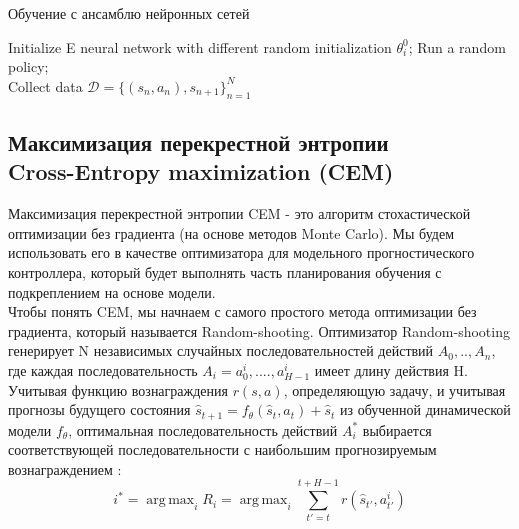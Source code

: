 \documentclass[a4paper,12pt]{article}
\DeclareMathOperator*{\argmax}{arg\,max}
\DeclareMathOperator*{\argmax}{arg\,max}
\begin{document}
\begin{algorithm}[H]
\SetAlgoLined
\DontPrintSemicolon
\caption{Обучение с ансамблю нейронных сетей}
Initialize E neural network with different random initialization $\theta_i^0$;
Run a random policy;\\
Collect data $\mathcal{D}=\{(s_n,a_n), s_{n+1}\}_{n=1}^N$\\
\end{algorithm}

\newpage
\subsection{Максимизация перекрестной энтропии\\
Cross-Entropy maximization (CEM)}
Максимизация перекрестной энтропии CEM - это алгоритм стохастической оптимизации без градиента (на основе методов Monte Carlo). Мы будем использовать его в качестве оптимизатора для модельного прогностического контроллера, который будет выполнять часть планирования обучения с подкреплением на основе модели. \\

Чтобы понять CEM, мы начнаем с самого простого метода оптимизации без градиента, который называется Random-shooting. Оптимизатор Random-shooting генерирует N независимых случайных последовательностей действий ${A_0,..,A_n}$, где каждая последовательность $A_i={a_0^i, ...., a_{H-1}^i}$ имеет длину действия H.\\

Учитывая функцию вознаграждения $r(s, a)$, определяющую задачу, и учитывая прогнозы будущего состояния $\hat{s}_{t+1}=f_\theta (\hat{s}_t, a_t)+\hat{s}_t$ из обученной динамической модели $f_\theta$, оптимальная последовательность действий $A_i^*$ выбирается соответствующей последовательности с наибольшим прогнозируемым вознаграждением :
$$i^*=\argmax_i R_i=\argmax_i \sum_{t'=t}^{t+H-1}r(\hat{s}_{t'},a_{t'}^i)$$
\end{document}
